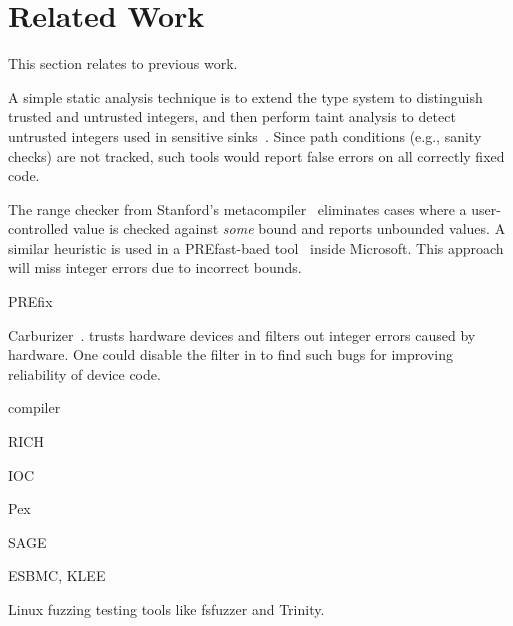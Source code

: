 \section{Related Work}
\label{s:relwk}

This section relates \sys to previous work.

A simple static analysis technique is to extend the type system to
distinguish trusted and untrusted integers, and then perform taint
analysis to detect untrusted integers used in sensitive sinks~\cite{cqual,
lclint}.  Since path conditions (e.g., sanity checks) are not
tracked, such tools would report false errors on all correctly fixed
code.

The range checker from Stanford's metacompiler~\cite{range-checker}
eliminates cases where a user-controlled value is checked against
\emph{some} bound and reports unbounded values.  A similar heuristic
is used in a PREfast-baed tool~\cite{prefast} inside Microsoft.
This approach will miss integer errors due to incorrect bounds.

PREfix~\cite{moy:prefix}

Carburizer~\cite{kadav:tolerating}.
\sys trusts hardware devices and filters out integer errors
caused by hardware.  One could disable the filter in \sys
to find such bugs for improving reliability of device code.


compiler

RICH~\cite{brumley:rich}

IOC

Pex

SAGE

ESBMC, KLEE

Linux fuzzing testing tools
like fsfuzzer and Trinity.

